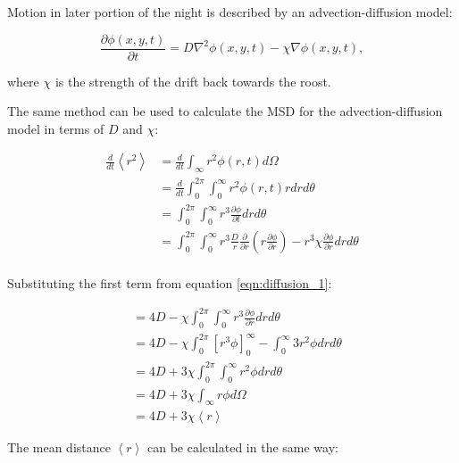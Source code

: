 \documentclass{article}
\newcommand{\eqn}[1]{equation \eqref{#1}}
\newcommand{\D}[2]{\frac{\partial #1}{\partial #2}}
\begin{document}
Motion in later portion of the night is described by an advection-diffusion model:

\begin{equation}
  \D{\phi(x,y,t)}{t} = D \nabla^2 \phi(x,y,t) - \chi \nabla \phi(x,y,t),
  \nonumber
\end{equation}

where $\chi$ is the strength of the drift back towards the roost.

The same method can be used to calculate the MSD for the advection-diffusion model in terms of $D$ and $\chi$:

\begin{equation}
\begin{split}
\frac{d}{dt} \left<r^2\right> &= \frac{d}{dt}\int_{\infty}r^2 \phi(r,t) d\Omega \\
                              &= \frac{d}{dt} \int_0^{2\pi}\int_0^{\infty} r^2 \phi(r,t) r dr d\theta \\
                              &= \int_0^{2\pi} \int_0^{\infty} r^3 \D{\phi}{t} dr d\theta \\
                              &= \int_0^{2\pi} \int_0^{\infty} r^3 \frac{D}{r} \D{}{r}\left(r \D{\phi}{r}\right)- r^3\chi\D{\phi}{r} dr d\theta \\
\end{split}
\end{equation}


Substituting the first term from \eqn{eqn:diffusion_1}:

\begin{equation}
\begin{split}
                              &= 4D - \chi \int_0^{2\pi} \int_0^{\infty} r^3 \D{\phi}{r} dr d\theta \\
                              &= 4D - \chi \int_0^{2\pi} \left[ r^3 \phi \right]_0^{\infty} - \int_0^{\infty}  3 r^2 \phi dr d\theta \\
                              &= 4D + 3\chi \int_0^{2\pi} \int_0^{\infty}  r^2 \phi dr d\theta  \\
                              &= 4D + 3\chi \int_{\infty} r \phi d\Omega \\
                              &= 4D + 3\chi \left<r\right>
\nonumber
\end{split}
\end{equation}

The mean distance $ \left<r\right>$ can be calculated in the same way:
\end{document}
